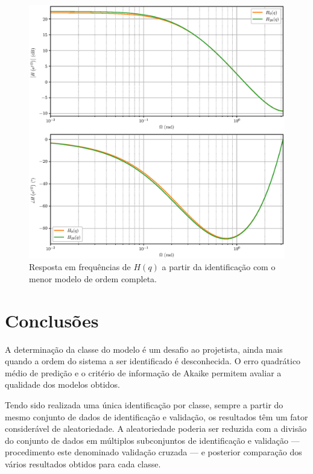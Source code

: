 \documentclass{ppgeesa}
\begin{document}
\begin{figure}[!htbp]
  \centering
  \includegraphics[width=\linewidth]{bode_H_28}
  \caption{Resposta em frequências de $H(q)$ a partir da identificação com o menor modelo de ordem completa.}
  \label{fig:bode_noise_complete}
\end{figure}

\section{Conclusões}

A determinação da classe do modelo é um desafio ao projetista, ainda mais quando a ordem do sistema a ser identificado é desconhecida.
O erro quadrático médio de predição e o critério de informação de Akaike permitem avaliar a qualidade dos modelos obtidos.

Tendo sido realizada uma única identificação por classe, sempre a partir do mesmo conjunto de dados de identificação e validação, os resultados têm um fator considerável de aleatoriedade.
A aleatoriedade poderia ser reduzida com a divisão do conjunto de dados em múltiplos subconjuntos de identificação e validação --- procedimento este denominado validação cruzada --- e posterior comparação dos vários resultados obtidos para cada classe.



\end{document}
